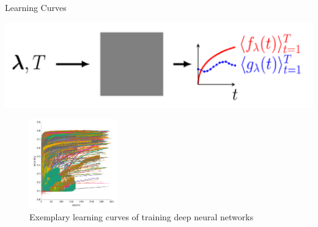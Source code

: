 
\begin{frame}{Learning Curves}
\begin{center}
\includegraphics[width=0.4\linewidth, keepaspectratio=true]{images/intro/graybox_optimization.png}
\end{center}

\begin{figure}
   \centering
   \includegraphics[width=0.34\textwidth]{../w07_hpo_speedup/images/learningcurve/learning_curve_domhan.png}
   \caption{Exemplary learning curves of training deep neural networks}
\end{figure}
\end{frame}

